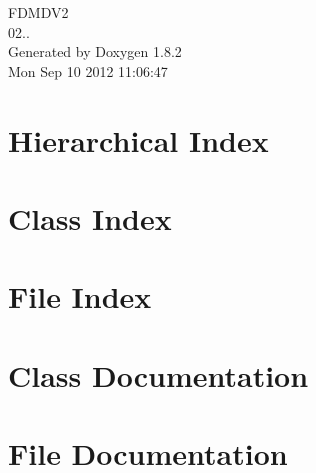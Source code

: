 \documentclass{book}
\begin{document}
\hypersetup{pageanchor=false,citecolor=blue}
\begin{titlepage}
\vspace*{7cm}
\begin{center}
{\Large F\-D\-M\-D\-V2 \\[1ex]\large 02.. }\\
\vspace*{1cm}
{\large Generated by Doxygen 1.8.2}\\
\vspace*{0.5cm}
{\small Mon Sep 10 2012 11:06:47}\\
\end{center}
\end{titlepage}
\clearemptydoublepage
{}
\tableofcontents
\clearemptydoublepage
{}
\hypersetup{pageanchor=true,citecolor=blue}
\chapter{Hierarchical Index}

\chapter{Class Index}

\chapter{File Index}

\chapter{Class Documentation}































\chapter{File Documentation}


\printindex
\end{document}
